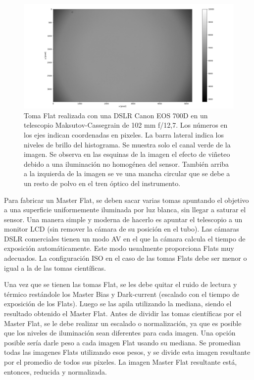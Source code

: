 \documentclass[a4paper, 12pt]{article}
\begin{document}
\begin{figure}[!ht]
  \centering
  \includegraphics[width=\textwidth]{img/flatx.png}
  \caption{\label{fig:flat} Toma Flat realizada con una DSLR Canon EOS 700D en un telescopio Maksutov-Cassegrain de 102 mm f/12,7.  Los números en los ejes indican coordenadas en pixeles. La barra lateral indica los niveles de brillo del histograma. Se muestra solo el canal verde de la imagen. Se observa en las esquinas de la imagen el efecto de viñeteo debido a una iluminación no homogénea del sensor. También arriba a la izquierda de la imagen se ve una mancha circular que se debe a un resto de polvo en el tren óptico del instrumento.}
\end{figure}

Para fabricar un Master Flat, se deben sacar varias tomas apuntando el objetivo a una superficie uniformemente iluminada por luz blanca, sin llegar a saturar el sensor. Una manera simple y moderna de hacerlo es apuntar el telescopio a un monitor LCD (sin remover la cámara de su posición en el tubo). Las cámaras DSLR comerciales tienen un modo AV en el que la cámara calcula el tiempo de exposición automáticamente. Este modo usualmente proporciona Flats muy adecuados. La configuración ISO en el caso de las tomas Flats debe ser menor o igual a la de las tomas científicas.

Una vez que se tienen las tomas Flat, se les debe quitar el ruido de lectura y térmico restándole los Master Bias y Dark-current (escalado con el tiempo de exposición de los Flats). Luego se las apila utilizando la mediana, siendo el resultado obtenido el Master Flat. Antes de dividir las tomas científicas por el Master Flat, se le debe realizar un escalado o normalización, ya que es posible que los niveles de iluminación sean diferentes para cada imagen. Una opción posible sería darle peso a cada imagen Flat usando su mediana. Se promedian todas las imagenes Flats utilizando esos pesos, y se divide esta imagen resultante por el promedio de todos sus pixeles. La imagen Master Flat resultante está, entonces, reducida y normalizada.
\end{document}
